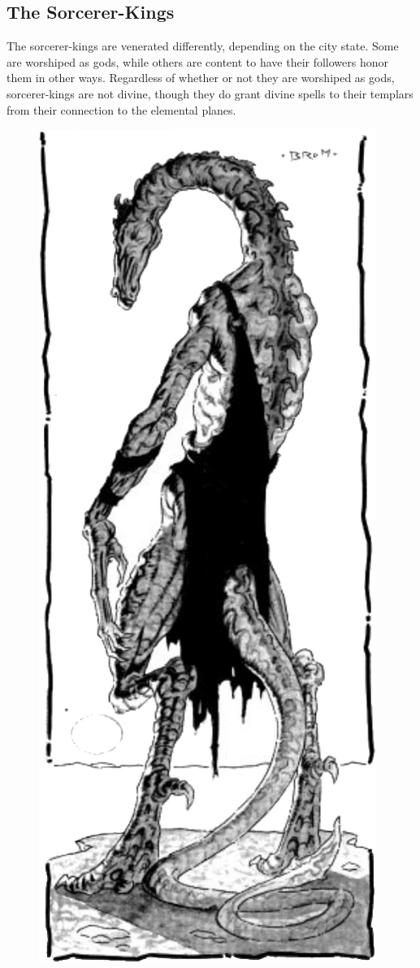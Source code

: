 \subsection{The Sorcerer-Kings}
The sorcerer-kings are venerated differently, depending on the city state. Some are worshiped as gods, while others are content to have their followers honor them in other ways. Regardless of whether or not they are worshiped as gods, sorcerer-kings are not divine, though they do grant divine spells to their templars from their connection to the elemental planes.

\begin{figure}[t!]
\centering
\includegraphics[width=\columnwidth]{images/dragon-1.png}
\end{figure}

